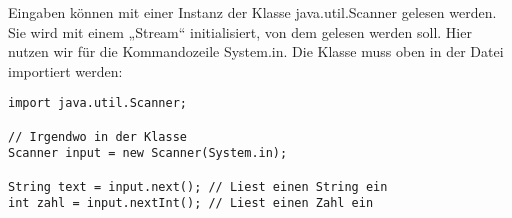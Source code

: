 \documentclass[10pt, a4paper, ngerman]{arbeitsblatt}
\begin{document}
Eingaben können mit einer Instanz der Klasse java.util.Scanner gelesen werden. Sie wird mit einem „Stream“ initialisiert, von dem gelesen werden soll. Hier nutzen wir für die Kommandozeile System.in. Die Klasse muss oben in der Datei importiert werden:

\begin{verbatim}
import java.util.Scanner;

// Irgendwo in der Klasse
Scanner input = new Scanner(System.in);

String text = input.next(); // Liest einen String ein
int zahl = input.nextInt(); // Liest einen Zahl ein
\end{verbatim}
\end{document}
